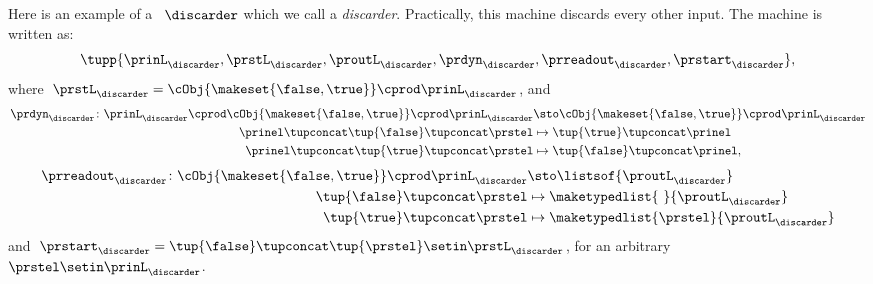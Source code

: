 \begin{example}[Discarder]
    Here is an example of a ~$\discarder$ which we call a \emph{discarder}.
    Practically, this machine discards every other input.
    The machine is written as:
    \begin{equation}
        \tupp{\prinL_{\discarder},\prstL_{\discarder},\proutL_{\discarder},\prdyn_{\discarder},\prreadout_{\discarder},\prstart_{\discarder}},
    \end{equation}
    where~$\prstL_{\discarder}= \cObj{\makeset{\false,\true}} \cprod \prinL_\discarder$, and
    \begin{equation}
        \begin{aligned}
            \prdyn_\discarder\colon \prinL_\discarder \cprod \cObj{\makeset{\false,\true}} \cprod \prinL_\discarder & \sto \cObj{\makeset{\false,\true}} \cprod \prinL_\discarder \\
            \prinel \tupconcat \tup{\false} \tupconcat \prstel                                                      & \mapsto \tup{ \true} \tupconcat \prinel \\
            \prinel \tupconcat \tup{\true} \tupconcat \prstel                                                       & \mapsto\tup{ \false} \tupconcat \prinel,
        \end{aligned}
    \end{equation}
    \begin{equation}
        \begin{aligned}
            \prreadout_\discarder\colon \cObj{\makeset{\false,\true}} \cprod \prinL_\discarder & \sto \listsof{\proutL_\discarder} \\
            \tup{\false} \tupconcat \prstel                                                    & \mapsto \maketypedlist{ \ }{\proutL_\discarder} \\
            \tup{\true} \tupconcat \prstel                                                     & \mapsto \maketypedlist{\prstel}{\proutL_\discarder}
        \end{aligned}
    \end{equation}
    and~$\prstart_\discarder = \tup{\false} \tupconcat \tup{\prstel} \setin \prstL_\discarder$, for an arbitrary~$\prstel\setin \prinL_\discarder$.
\end{example}


